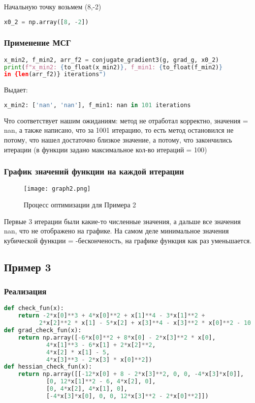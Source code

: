 \documentclass{article}
\begin{document}
Начальную точку возьмем (8,-2)

\begin{lstlisting}[language=Python]
x0_2 = np.array([8, -2])
\end{lstlisting}

\newpage
\subsubsection{Применение МСГ}
\begin{lstlisting}[language=Python]
x_min2, f_min2, arr_f2 = conjugate_gradient3(g, grad_g, x0_2)
print(f"x_min2: {to_float(x_min2)}, f_min1: {to_float(f_min2)}
in {len(arr_f2)} iterations")
\end{lstlisting}

Выдает:
\begin{lstlisting}[language=Python]
x_min2: ['nan', 'nan'], f_min1: nan in 101 iterations
\end{lstlisting}

Что соответствует нашим ожиданиям: метод не отработал корректно, значения = nan, а также написано, что за 1001 итерацию, то есть метод остановился не потому, что нашел достаточно близкое значение, а потому, что закончились итерации (в функции задано максимальное кол-во итераций = 100)

\subsubsection{График значений функции на каждой итерации}
\begin{figure}[H]
    \centering
    \texttt{[image: graph2.png]}
    \caption{Процесс оптимизации для Примера 2}
\end{figure}
Первые 3 итерации были какие-то численные значения, а дальше все значения nan, что не отображено на графике. На самом деле минимальное значения кубической функции = -бесконченость, на графике функция как раз уменьшается.

\newpage
\subsection{Пример 3}

\subsubsection{Реализация}
\begin{lstlisting}[language=Python]
def check_fun(x):
    return -2*x[0]**3 + 4*x[0]**2 + x[1]**4 - 3*x[1]**2 +
    	  2*x[2]**2 * x[1] - 5*x[2] + x[3]**4 - x[3]**2 * x[0]**2 - 10
def grad_check_fun(x):
    return np.array([-6*x[0]**2 + 8*x[0] - 2*x[3]**2 * x[0],
            4*x[1]**3 - 6*x[1] + 2*x[2]**2,
            4*x[2] * x[1] - 5,
            4*x[3]**3 - 2*x[3] * x[0]**2])
def hessian_check_fun(x):
    return np.array([[-12*x[0] + 8 - 2*x[3]**2, 0, 0, -4*x[3]*x[0]],
            [0, 12*x[1]**2 - 6, 4*x[2], 0],
            [0, 4*x[2], 4*x[1], 0],
            [-4*x[3]*x[0], 0, 0, 12*x[3]**2 - 2*x[0]**2]])
\end{lstlisting}
\end{document}
